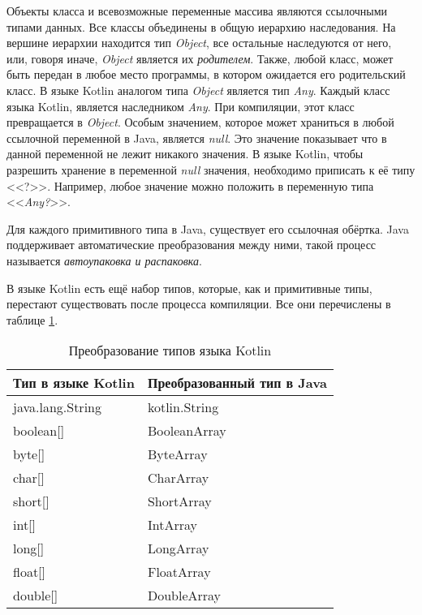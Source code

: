Объекты класса и всевозможные переменные массива являются ссылочными типами данных. Все классы объединены в общую иерархию наследования. На вершине иерархии находится тип \textit{Object}, все остальные наследуются от него, или, говоря иначе, \textit{Object} является их \textit{родителем}. Также, любой класс, может быть передан в любое место программы, в котором ожидается его родительский класс. В языке Kotlin аналогом типа \textit{Object} является тип \textit{Any}. Каждый класс языка Kotlin, является наследником \textit{Any}. При компиляции, этот класс превращается в \textit{Object}.
Особым значением, которое может храниться в любой ссылочной переменной в Java, является \textit{null}. Это значение показывает что в данной переменной не лежит никакого значения. В языке Kotlin, чтобы разрешить хранение в переменной \textit{null} значения, необходимо приписать к её типу <<?>>. Например, любое значение можно положить в переменную типа <<\textit{Any?}>>.

Для каждого примитивного типа в Java, существует его ссылочная обёртка. Java поддерживает автоматические преобразования между ними, такой процесс называется \textit{автоупаковка и распаковка}.

В языке Kotlin есть ещё набор типов, которые, как и примитивные типы, перестают существовать после процесса компиляции. Все они перечислены в таблице \ref{tab:kotlinTypeConversion}.

\begin{table}[h]
\caption{\label{tab:kotlinTypeConversion}Преобразование типов языка Kotlin}
\begin{center}
\begin{tabular}{|l|l|}
\hline
Тип в языке Kotlin & Преобразованный тип в Java \\
\hline
java.lang.String & kotlin.String \\
boolean[]  & BooleanArray  \\
byte[]  & ByteArray \\
char[]  & CharArray \\
short[]  & ShortArray \\
int[] & IntArray \\
long[] &  LongArray \\
float[] & FloatArray \\
double[] & DoubleArray \\
\hline
\end{tabular}
\end{center}
\end{table}

